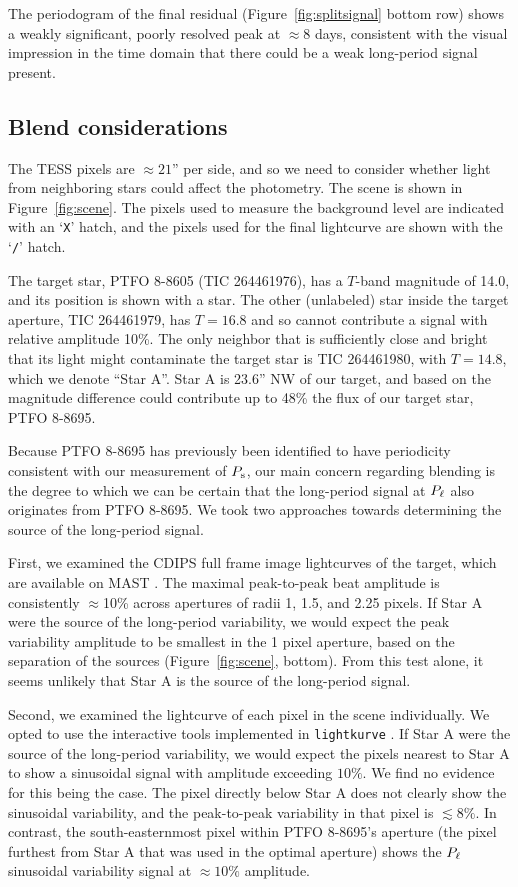 \documentclass[12pt,twocolumn,tighten]{aastex62}
\begin{document}
The periodogram of the final residual (Figure~\ref{fig:splitsignal}
bottom row) shows a weakly significant, poorly resolved peak at
$\approx$8 days, consistent with the visual impression in the time
domain that there could be a weak long-period signal present.


\subsection{Blend considerations}
\label{subsec:blend}

The TESS pixels are $\approx21$'' per side, and so we need to consider
whether light from neighboring stars could affect the photometry.  The
scene is shown in Figure~\ref{fig:scene}.  
The pixels used to
measure the background level are indicated with an `\texttt{X}' hatch,
and the pixels used for the final lightcurve are shown with the
`\texttt{/}' hatch.

The target star, PTFO
8-8605 (TIC 264461976), has a $T$-band magnitude of 14.0, and its position is shown with a
star.  
The other (unlabeled) star inside the target aperture, TIC 264461979, has $T=16.8$ and so cannot
contribute a signal with relative amplitude 10\%.
The only neighbor that is sufficiently close and bright that
its light might contaminate the target star is TIC 264461980, with
$T=14.8$, which we denote ``Star A''.  Star A is 23.6'' NW of our
target, and based on the magnitude difference could contribute up to
48\% the flux of our target star, PTFO 8-8695.  

Because PTFO 8-8695 has previously been identified to have periodicity
consistent with our measurement of $P_{\rm s}$, our main concern
regarding blending is the degree to which we can be certain that the
long-period signal at $P_{\rm \ell}$ also originates from PTFO 8-8695.
We took two approaches towards determining the source of the long-period signal.

First, we examined the CDIPS full frame image lightcurves of the
target, which are available on MAST \citep{bouma_cluster_2019}.
The maximal peak-to-peak beat amplitude is consistently $\approx$10\%
across apertures of radii 1, 1.5, and 2.25 pixels.
If Star A were the source of the long-period variability, we would expect the
peak variability amplitude to be smallest in the 1 pixel aperture, based on the
separation of the sources (Figure~\ref{fig:scene}, bottom).
From this test alone, it seems unlikely that Star A is the source of
the long-period signal.

Second, we examined the lightcurve of each pixel in the scene
individually.  We opted to use the
interactive tools implemented in
\texttt{lightkurve} \citep{lightkurve_2018}.  If Star A were the
source of the long-period variability, we would expect the pixels
nearest to Star A to show a sinusoidal signal with
amplitude exceeding $10\%$.  We find no evidence for
this being the case.  The pixel directly below Star A does not
clearly show the sinusoidal variability, and the peak-to-peak 
variability in that pixel is $\lesssim 8\%$.  In contrast, the
south-easternmost pixel within PTFO 8-8695's aperture (the pixel 
furthest from Star A that was used in the optimal aperture) shows the $P_{\rm \ell}$ sinusoidal
variability signal at $\approx 10\%$ amplitude.
\end{document}
